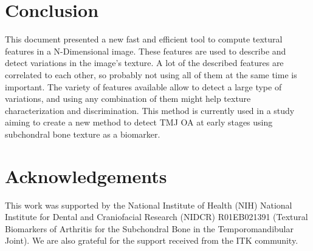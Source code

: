 \documentclass{InsightArticle}
\begin{document}
\newpage
\section{Conclusion}
\label{sec:conclusions}

This document presented a new fast and efficient tool to compute textural features in a  N-Dimensional image. These features are used to describe and detect variations in the image's texture. A lot of the described features are correlated to each other, so probably not using all of them at the same time is important. The variety of features available allow to detect a large type of variations, and using any combination of them might help texture characterization and discrimination. This method is currently used in a study aiming to create a new method to detect TMJ OA at early stages using subchondral bone texture as a biomarker.

\section*{Acknowledgements}

This work was supported by the National Institute of Health (NIH) National Institute for Dental and Craniofacial Research (NIDCR) R01EB021391 (Textural Biomarkers of Arthritis for the Subchondral Bone in the Temporomandibular Joint). We are also grateful for the support received from the ITK community.

%
%
\newpage


\end{document}

